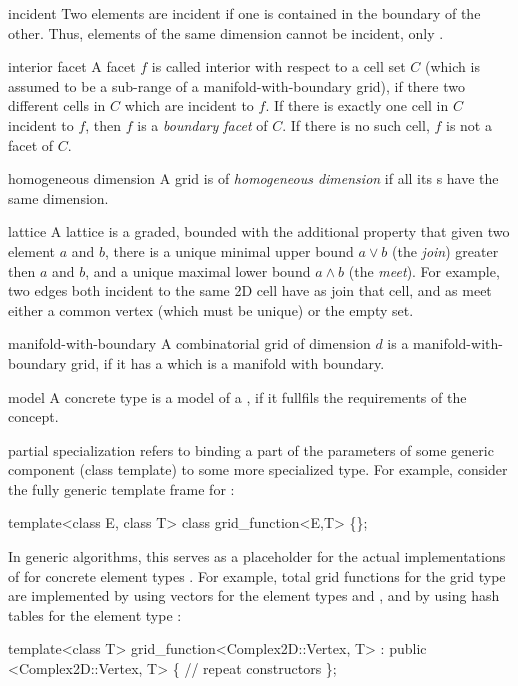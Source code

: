 \begin{Glossar}
\item[incident]
 Two elements are incident if one is contained in the boundary 
 of the other. Thus, elements of the same dimension cannot be incident,
 only .

\item[interior facet] A facet $f$ is called interior with respect to a cell set 
  $C$ (which is assumed to be a sub-range of a manifold-with-boundary grid),
  if there two different cells in $C$ which are incident to $f$.
  If there is exactly one cell in $C$ incident to $f$, then $f$ is a
  {\sl boundary facet\/} of $C$. If there is no such cell, $f$ is not a facet 
  of $C$.

\item[homogeneous dimension]
 A grid is of \emph{homogeneous dimension} if all its 
 s have the same dimension.

\item[lattice]
  A lattice is a graded, bounded 
  with the additional property that given two element $a$ and $b$,
  there is a unique minimal upper bound $a \vee b$ (the {\sl join\/})
  greater then $a$ and $b$,
  and a unique maximal lower bound $a \wedge b$ (the {\sl meet\/}).
  For example, two edges both incident to the same 2D cell have
  as join that cell, and as meet either a common vertex (which must be unique)
  or the empty set.

\item[manifold-with-boundary]
  A combinatorial grid of dimension $d$ is a manifold-with-boundary grid,
  if it has a {\sl {}} which is a manifold with boundary.

\item[model]
  A concrete type is a model of a ,
  if it fullfils the requirements of the concept.

\item[partial specialization] refers to binding a part of the parameters 
  of some generic component (class template) to some more specialized type.
  For example, consider the fully generic template frame for 
  :
  \begin{example}
  template<class E, class T>
  class grid_function<E,T> \{\};
  \end{example}
  In generic algorithms, this serves as a placeholder for the actual implementations of 
   for concrete element  types .
  For example, total grid functions for the 
  grid type are implemented by using vectors for the element types 
  and , and by using hash tables for the element type :
  \begin{example}
  template<class T>
  grid_function<Complex2D::Vertex, T> 
    : public <Complex2D::Vertex, T> \{
    // repeat constructors
  \};


\end{example}
\end{Glossar}
